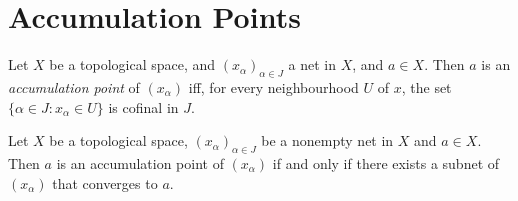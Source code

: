 \section{Accumulation Points}

  \begin{df}
  Let $X$ be a topological space, and $(x_\alpha)_{\alpha \in J}$ a net in $X$,
and $a \in X$.    Then $a$ is an \emph{accumulation point} of $(x_\alpha)$ iff,
for every    neighbourhood $U$ of $x$, the set $\{ \alpha \in J : x_\alpha \in
U \}$ is cofinal in $J$.
\end{df}

  \begin{lm}
    \label{lm:topology:accumulation_point:subnet}
  Let $X$ be a topological space, $(x_\alpha)_{\alpha \in J}$ be a
nonempty net in $X$
and $a \in X$. Then $a$ is an accumulation point of $(x_\alpha)$ if and only if
there exists a subnet of $(x_\alpha)$ that converges to $a$.
\end{lm}

